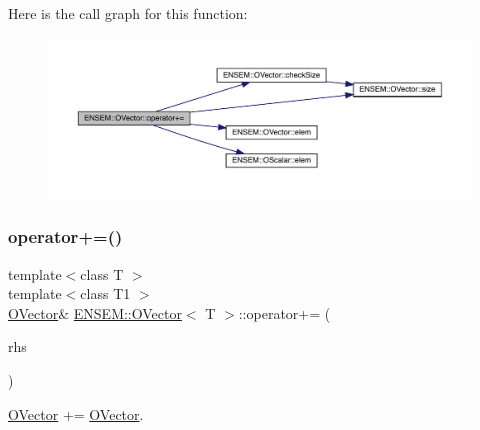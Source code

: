 Here is the call graph for this function\+:
\nopagebreak
\begin{figure}[H]
\begin{center}
\leavevmode
\includegraphics[width=350pt]{d0/d8d/classENSEM_1_1OVector_a6cb710cbb29083f2849c48da65292174_cgraph}
\end{center}
\end{figure}
\mbox{\label{classENSEM_1_1OVector_a5ecd1c4c6a2e7d9a6a3e5189b3a22ba5}} 
\subsubsection{\texorpdfstring{operator+=()}{operator+=()}\hspace{0.1cm}{\footnotesize\ttfamily [4/6]}}
{\footnotesize\ttfamily template$<$class T $>$ \\
template$<$class T1 $>$ \\
\mbox{\hyperlink{classENSEM_1_1OVector}{O\+Vector}}\& \mbox{\hyperlink{classENSEM_1_1OVector}{E\+N\+S\+E\+M\+::\+O\+Vector}}$<$ T $>$\+::operator+= (\begin{DoxyParamCaption}\item[{const \mbox{\hyperlink{classENSEM_1_1OVector}{O\+Vector}}$<$ T1 $>$ \&}]{rhs }\end{DoxyParamCaption})\hspace{0.3cm}{\ttfamily [inline]}}



\mbox{\hyperlink{classENSEM_1_1OVector}{O\+Vector}} += \mbox{\hyperlink{classENSEM_1_1OVector}{O\+Vector}}. 

